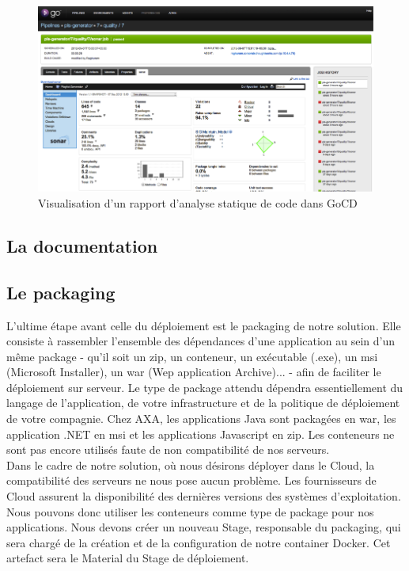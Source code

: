       \begin{figure}
        \begin{center}
          \includegraphics[scale=0.7]{images/GoCDSonar.png}
        \end{center}
        \caption{Visualisation d'un rapport d'analyse statique de code dans GoCD}
        \label{GoCDSonar}
      \end{figure}

      \subsection{La documentation}

      \subsection{Le packaging}
      L'ultime étape avant celle du déploiement est le packaging de notre solution. Elle consiste à rassembler l'ensemble des dépendances d'une application au sein d'un même package - qu'il soit un zip, un conteneur, un exécutable (.exe), un msi (Microsoft Installer), un war (Wep application Archive)... - afin de faciliter le déploiement sur serveur. Le type de package attendu dépendra essentiellement du langage de l'application, de votre infrastructure et de la politique de déploiement de votre compagnie. Chez AXA, les applications Java sont packagées en war, les application .NET en msi et les applications Javascript en zip. Les conteneurs ne sont pas encore utilisés faute de non compatibilité de nos serveurs.\\

      Dans le cadre de notre solution, où nous désirons déployer dans le Cloud, la compatibilité des serveurs ne nous pose aucun problème. Les fournisseurs de Cloud assurent la disponibilité des dernières versions des systèmes d'exploitation. Nous pouvons donc utiliser les conteneurs comme type de package pour nos applications. Nous devons créer un nouveau Stage, responsable du packaging, qui sera chargé de la création et de la configuration de notre container Docker. Cet artefact sera le Material du Stage de déploiement.

